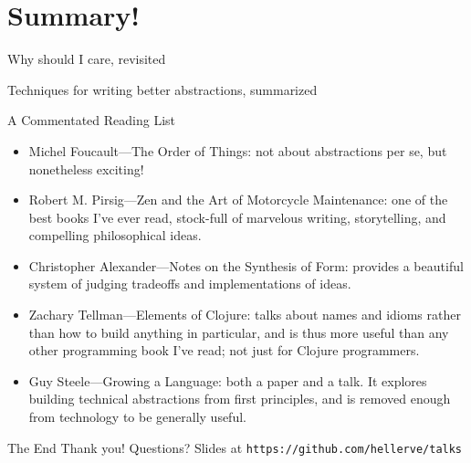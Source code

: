 \documentclass[aspectratio=169]{beamer}
\begin{document}
  \section{Summary!}
  \begin{frame}{Why should I care, revisited}
  \end{frame}
  \begin{frame}{Techniques for writing better abstractions, summarized}
  \end{frame}
  \begin{frame}{A Commentated Reading List}
    \begin{itemize}
      \item Michel Foucault—The Order of Things: not about abstractions per se,
            but nonetheless exciting!
      \item Robert M. Pirsig—Zen and the Art of Motorcycle Maintenance: one of
            the best books I’ve ever read, stock-full of marvelous writing,
            storytelling, and compelling philosophical ideas.
      \item Christopher Alexander—Notes on the Synthesis of Form: provides a
            beautiful system of judging tradeoffs and implementations of ideas.
      \item Zachary Tellman—Elements of Clojure: talks about names and idioms
            rather than how to build anything in particular, and is thus more
            useful than any other programming book I’ve read; not just for
            Clojure programmers.
      \item Guy Steele—Growing a Language: both a paper and a talk. It explores
            building technical abstractions from first principles, and is
            removed enough from technology to be generally useful.
    \end{itemize}
  \end{frame}
  \begin{frame}{The End}
    \Huge Thank you!
    \linebreak
    \linebreak
    \linebreak
    \small Questions?
    \linebreak
    \linebreak
    \tiny Slides at \texttt{https://github.com/hellerve/talks}
  \end{frame}
\end{document}

